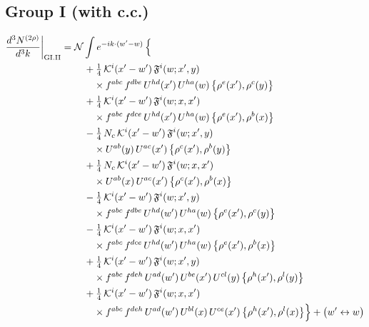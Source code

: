 \documentclass[10pt]{article}
\numberwithin{equation}{section}
\newcommand{\KK}{\mathcal K}
\newcommand{\NN}{\mathcal N}
\begin{document}
\subsection*{Group I (with c.c.)}
\begin{align}
\frac{d^3N^{(2\rho)}}{d^3k}\bigg|_{\rm GI.II}={}&\NN\int e^{-ik\cdot(w'-w)}\,\Big\{\notag\\
&\quad +\tfrac14\,\KK^{i}(x'-w')\,\mathfrak F^{i}(w;x',y)\notag\\
&\qquad\times f^{abc}\,f^{dbe}\,U^{hd}(x')\,U^{ha}(w)\,\big\{\rho^{e}(x'),\rho^{c}(y)\big\}\notag\\
&\quad +\tfrac14\,\KK^{i}(x'-w')\,\mathfrak F^{i}(w;x,x')\notag\\
&\qquad\times f^{abc}\,f^{dce}\,U^{hd}(x')\,U^{ha}(w)\,\big\{\rho^{e}(x'),\rho^{b}(x)\big\}\notag\\
&\quad -\tfrac14\,N_{c}\,\KK^{i}(x'-w')\,\mathfrak F^{i}(w;x',y)\notag\\
&\qquad\times U^{ab}(y)\,U^{ac}(x')\,\big\{\rho^{c}(x'),\rho^{b}(y)\big\}\notag\\
&\quad +\tfrac14\,N_{c}\,\KK^{i}(x'-w')\,\mathfrak F^{i}(w;x,x')\notag\\
&\qquad\times U^{ab}(x)\,U^{ac}(x')\,\big\{\rho^{c}(x'),\rho^{b}(x)\big\}\notag\\
&\quad -\tfrac14\,\KK^{i}(x'-w')\,\mathfrak F^{i}(w;x',y)\notag\\
&\qquad\times f^{abc}\,f^{dbe}\,U^{hd}(w')\,U^{ha}(w)\,\big\{\rho^{e}(x'),\rho^{c}(y)\big\}\notag\\
&\quad -\tfrac14\,\KK^{i}(x'-w')\,\mathfrak F^{i}(w;x,x')\notag\\
&\qquad\times f^{abc}\,f^{dce}\,U^{hd}(w')\,U^{ha}(w)\,\big\{\rho^{e}(x'),\rho^{b}(x)\big\}\notag\\
&\quad +\tfrac14\,\KK^{i}(x'-w')\,\mathfrak F^{i}(w;x',y)\notag\\
&\qquad\times f^{abc}\,f^{deh}\,U^{ad}(w')\,U^{be}(x')\,U^{cl}(y)\,\big\{\rho^{h}(x'),\rho^{l}(y)\big\}\notag\\
&\quad +\tfrac14\,\KK^{i}(x'-w')\,\mathfrak F^{i}(w;x,x')\notag\\
&\qquad\times f^{abc}\,f^{deh}\,U^{ad}(w')\,U^{bl}(x)\,U^{ce}(x')\,\big\{\rho^{h}(x'),\rho^{l}(x)\big\}\Big\}+\big(w'\leftrightarrow w\big)\label{R:eq:sum-GI.II}
\end{align}
\end{document}
